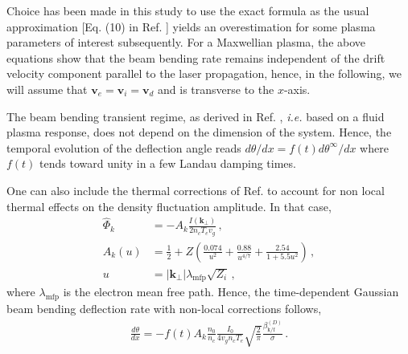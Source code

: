 \documentclass[%
 reprint,
 amsmath,amssymb,
 aps,
]{revtex4-1}
\begin{document}
Choice has been made in this study to use the exact formula as the usual approximation [Eq. (10) in Ref. \cite{POP_Ruyer_2020}] yields an overestimation for some plasma parameters of interest subsequently.
For a Maxwellian plasma, the above equations show that   the beam bending rate remains independent of the drift velocity component parallel to the laser propagation, hence,  in the following,  we will assume  that $\mathbf{v}_e=\mathbf{v}_i=\mathbf{v}_d$ and is  transverse to the  $x$-axis.

The beam bending transient regime, as derived in 
 Ref. \cite[]{POP_Ruyer_2020}, \emph{i.e.} based on a fluid plasma response, does not depend on the dimension of the system. Hence, the temporal evolution of the deflection angle reads $d \theta/dx  =f(t)d \theta^{\infty}/dx $   where $f(t)$ tends toward unity in a few Landau damping times.
 
One can also include the thermal corrections of Ref. \cite[]{Bychenkov_2000} to account for non local thermal effects on the density fluctuation amplitude.
In that case,
\begin{align}
     \hat{\Phi}_k&= -A_k\frac{I(\mathbf{k}_\perp)}{2n_c T_e v_g} \, ,\nonumber\\
     A_k(u)   &= \frac{1}{2} +Z\left( \frac{0.074}{u^2}+ \frac{0.88}{u^{4/7}} + \frac{2.54}{1+5.5u^2} \right) \, ,\nonumber \\ 
     u &=\vert \mathbf{k}_\perp \vert\lambda_\mathrm{mfp} \sqrt{Z_i}\label{eq:nl}\, ,
\end{align}
where $\lambda_\mathrm{mfp}$ is the electron mean free path. 
Hence, the time-dependent Gaussian beam bending deflection rate with non-local corrections follows,
  \begin{align}
  \frac{d\theta }{dx}= - f(t) A_k \frac{n_0 }{n_c}  \frac{  I_0 }{ 4 v_g n_c T_e } \sqrt{\frac{2}{\pi}}   \frac{\beta_\mathrm{k/f}^{(D)} }{ \sigma}     
  \, .\label{eq:bbf} 
\end{align}
\end{document}
